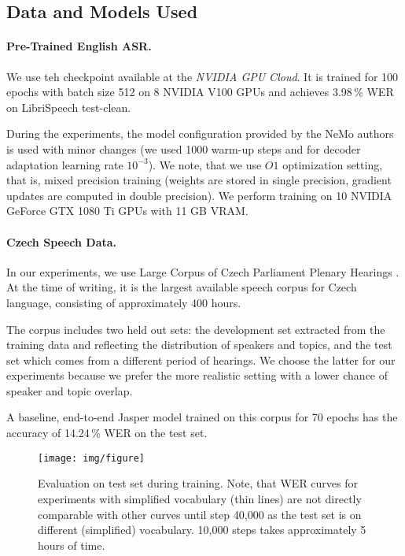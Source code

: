 \subsection{Data and Models Used}
\label{sec:data_models}


\paragraph{Pre-Trained English ASR.}

We use teh checkpoint available at the \textit{NVIDIA GPU Cloud}. It is trained for 100 epochs with batch size 512 on 8 NVIDIA V100 GPUs and achieves 3.98\,\% WER on LibriSpeech  test-clean.

During the experiments, the model configuration provided by the NeMo authors is used with minor changes (we used 1000 warm-up steps and for decoder adaptation learning rate $10^{-3}$). We note, that we use $O1$ optimization setting, that is, mixed precision training (weights are stored in single precision, gradient updates are computed in double precision). We perform training on 10 NVIDIA GeForce GTX 1080 Ti GPUs with 11 GB VRAM.


\paragraph{Czech Speech Data.}
In our experiments, we use Large Corpus of Czech Parliament Plenary Hearings . At the time of writing, it is the largest available speech corpus for Czech language, consisting of approximately 400 hours.

The corpus includes two held out sets: the development set extracted from the training data and reflecting the distribution of speakers and topics, and the test set which comes from a different period of hearings. We choose the latter for our experiments because we prefer the more realistic setting with a lower chance of speaker and topic overlap.

A baseline, end-to-end Jasper model trained on this corpus for 70 epochs has the accuracy of 14.24\,\% WER on the test set.

\begin{landscape}
	\begin{figure}[t]
		\texttt{[image: img/figure]}
		\caption{Evaluation on test set during training. %
			Note, that WER curves for experiments with simplified vocabulary (thin lines) are not directly comparable with other curves until step 40,000 as the test set is on different (simplified) vocabulary. 10,000 steps takes approximately 5 hours of time.}
		\label{fig:training}
	\end{figure}
\end{landscape}



